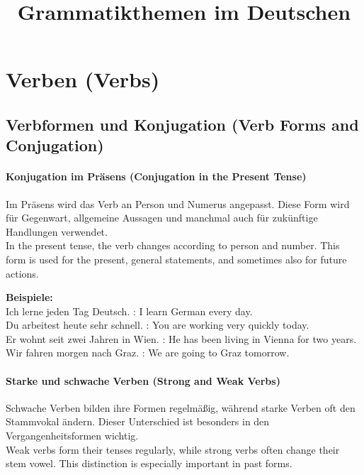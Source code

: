 \documentclass[a4paper]{article}
\title{Grammatikthemen im Deutschen}
\date{}
\begin{document}
    \maketitle
    
    
    \section{Verben {\small (Verbs)}}
        
        \subsection{Verbformen und Konjugation {\small (Verb Forms and Conjugation)}}
            
            \paragraph{Konjugation im Präsens {\small (Conjugation in the Present Tense)}}
                Im Präsens wird das Verb an Person und Numerus angepasst. Diese Form wird für Gegenwart, allgemeine Aussagen und manchmal auch für zukünftige Handlungen verwendet.\\
                In the present tense, the verb changes according to person and number. This form is used for the present, general statements, and sometimes also for future actions.
                
                \textbf{Beispiele:}\\
                Ich lerne jeden Tag Deutsch. : I learn German every day.\\
                Du arbeitest heute sehr schnell. : You are working very quickly today.\\
                Er wohnt seit zwei Jahren in Wien. : He has been living in Vienna for two years.\\
                Wir fahren morgen nach Graz. : We are going to Graz tomorrow.
            
            \paragraph{Starke und schwache Verben {\small (Strong and Weak Verbs)}}
                Schwache Verben bilden ihre Formen regelmäßig, während starke Verben oft den Stammvokal ändern. Dieser Unterschied ist besonders in den Vergangenheitsformen wichtig.\\
                Weak verbs form their tenses regularly, while strong verbs often change their stem vowel. This distinction is especially important in past forms.
                
\end{document}
